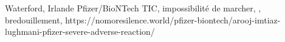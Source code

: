           {Waterford, Irlande}
          {}
          {Pfizer/BioNTech}
          {}
          {TIC, impossibilité de marcher, , bredouillement, }
          {https://nomoresilence.world/pfizer-biontech/arooj-imtiaz-lughmani-pfizer-severe-adverse-reaction/}
